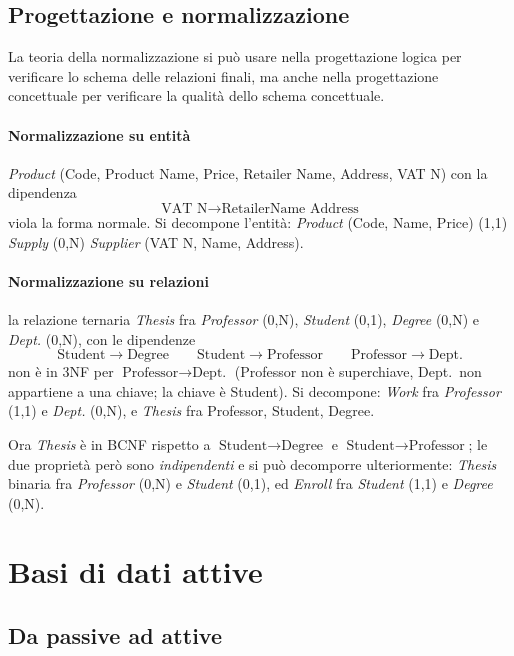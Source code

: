 \documentclass[a4paper,12pt]{article}
\begin{document}
\subsection{Progettazione e normalizzazione}

La teoria della normalizzazione si può usare nella progettazione logica per
verificare lo schema delle relazioni finali, ma anche nella progettazione
concettuale per verificare la qualità dello schema concettuale.

\paragraph{Normalizzazione su entità} \emph{Product} (Code, Product Name,
Price, Retailer Name, Address, VAT N) con la dipendenza
\[ \text{VAT N} \to \text{RetailerName Address} \]
viola la forma normale. Si decompone l'entità: \emph{Product} (Code, Name,
Price) (1,1) \emph{Supply} (0,N) \emph{Supplier} (VAT N, Name, Address).

\paragraph{Normalizzazione su relazioni} la relazione ternaria \emph{Thesis}
fra \emph{Professor} (0,N), \emph{Student} (0,1), \emph{Degree} (0,N) e
\emph{Dept.} (0,N), con le dipendenze
\[
\text{Student} \to \text{Degree} \qquad
\text{Student} \to \text{Professor} \qquad
\text{Professor} \to \text{Dept.}
\]
non è in 3NF per $\text{Professor} \to \text{Dept.}$ (Professor non è
superchiave, Dept.\ non appartiene a una chiave; la chiave è Student). Si
decompone: \emph{Work} fra \emph{Professor} (1,1) e \emph{Dept.} (0,N), e
\emph{Thesis} fra Professor, Student, Degree.

Ora \emph{Thesis} è in BCNF rispetto a $\text{Student} \to \text{Degree}$ e
$\text{Student} \to \text{Professor}$; le due proprietà però sono
\emph{indipendenti} e si può decomporre ulteriormente: \emph{Thesis} binaria
fra \emph{Professor} (0,N) e \emph{Student} (0,1), ed \emph{Enroll} fra
\emph{Student} (1,1) e \emph{Degree} (0,N).

\section{Basi di dati attive}

\subsection{Da passive ad attive}
\end{document}
